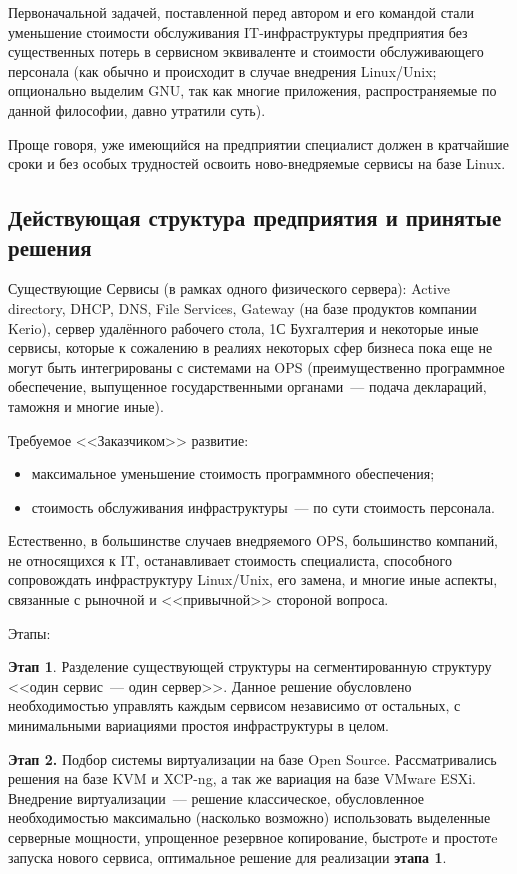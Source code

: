 \documentclass[10pt, a5paper]{article}
\begin{document}
Первоначальной задачей, поставленной перед автором и его командой стали уменьшение стоимости обслуживания IT-\linebreak инфраструктуры предприятия без существенных потерь в сервисном эквиваленте и стоимости обслуживающего персонала (как обычно и происходит в случае внедрения Linux/Unix; опционально выделим GNU, так как многие приложения, распространяемые по данной философии, давно утратили суть).

Проще говоря, уже имеющийся на предприятии специалист должен в кратчайшие сроки и без особых трудностей освоить ново-внедряемые сервисы на базе Linux.

\subsection*{Действующая структура предприятия и принятые решения}

Существующие Сервисы (в рамках одного физического сервера): Active directory, DHCP, DNS, File Services, Gateway (на базе продуктов компании Kerio), сервер удалённого рабочего стола, 1С Бухгалтерия и некоторые иные сервисы, которые к сожалению в реалиях некоторых сфер бизнеса пока еще не могут быть интегрированы с системами на OPS (преимущественно программное обеспечение, выпущенное государственными органами~--- подача деклараций, таможня и многие иные).

Требуемое <<Заказчиком>> развитие:

\begin{itemize}
  \item максимальное уменьшение стоимость программного обеспечения;
  \item стоимость обслуживания инфраструктуры~--- по сути стоимость персонала.
\end{itemize}

Естественно, в большинстве случаев внедряемого OPS, большинство компаний, не относящихся к IT, останавливает стоимость специалиста, способного сопровождать инфраструктуру Linux/Unix, его замена, и многие иные аспекты, связанные с рыночной и <<привычной>> стороной вопроса.

Этапы:

\textbf{Этап 1}. Разделение существующей структуры на сегментированную структуру <<один сервис~--- один сервер>>.
Данное решение обусловлено необходимостью управлять каждым сервисом независимо от остальных, с минимальными вариациями простоя инфраструктуры в целом.

\textbf{Этап 2.} Подбор системы виртуализации на базе Open Source.
Рассматривались решения на базе KVM и XCP-ng, а так же вариация на базе VMware ESXi. Внедрение виртуализации~--- решение классическое, обусловленное необходимостью максимально (насколько возможно) использовать выделенные серверные мощности, упрощенное резервное копирование, быстротe и простотe запуска нового сервиса, оптимальное решение для реализации \textbf{этапа 1}.
\end{document}
